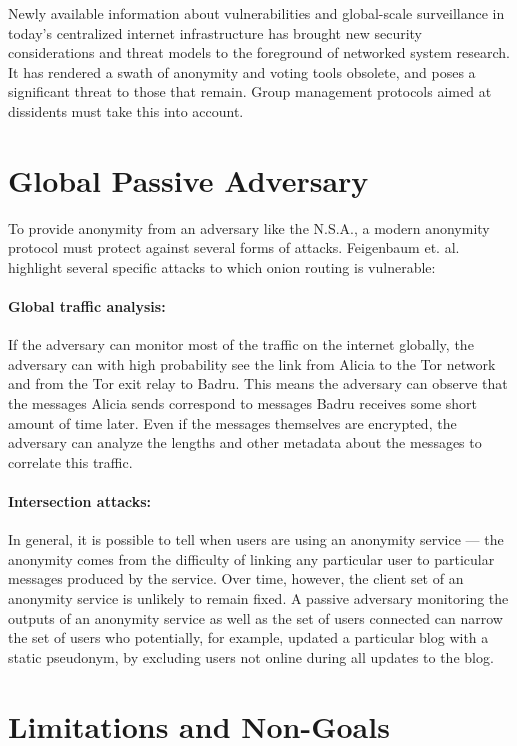 Newly available information about vulnerabilities and global-scale
surveillance in today's centralized internet infrastructure has brought new
security considerations and threat models to the foreground of networked
system research. It has rendered a swath of anonymity and voting tools
obsolete, and poses a significant threat to those that remain. Group
management protocols aimed at dissidents must take this into account.

\section{Global Passive Adversary}
  To provide anonymity from an adversary like the N.S.A., a modern anonymity
  protocol must protect against several forms of attacks. Feigenbaum et.
  al.\cite{feigenbaum_seeking_2013} highlight several specific attacks to
  which onion routing is vulnerable:
  \paragraph{Global traffic analysis:}
  If the adversary can monitor most of the traffic on the internet globally,
  the adversary can with high probability see the link from Alicia to the Tor
  network and from the Tor exit relay to Badru. This means the adversary can
  observe that the messages Alicia sends correspond to messages Badru receives
  some short amount of time later. Even if the messages themselves are
  encrypted, the adversary can analyze the lengths and other metadata about
  the messages to correlate this traffic.
  \paragraph{Intersection attacks:}
  In general, it is possible to tell when users are using an anonymity service
  --- the anonymity comes from the difficulty of linking any particular user
  to particular messages produced by the service. Over time, however, the
  client set of an anonymity service is unlikely to remain fixed. A passive
  adversary monitoring the outputs of an anonymity service as well as the set
  of users connected can narrow the set of users who potentially, for example,
  updated a particular blog with a static pseudonym, by excluding users  not
  online during all updates to the blog.

\section{Limitations and Non-Goals}
